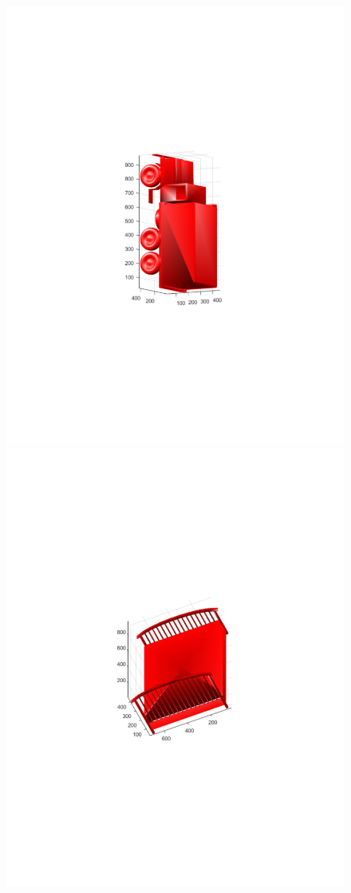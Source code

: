 \documentclass{UCF_ETD}
\begin{document}
\begin{figure}[H]
\begin{center}
\includegraphics[scale=0.4]{RobustRegistration/Truck}
\includegraphics[scale=0.4]{RobustRegistration/Bed}

\end{center}
\end{figure}
\end{document}
